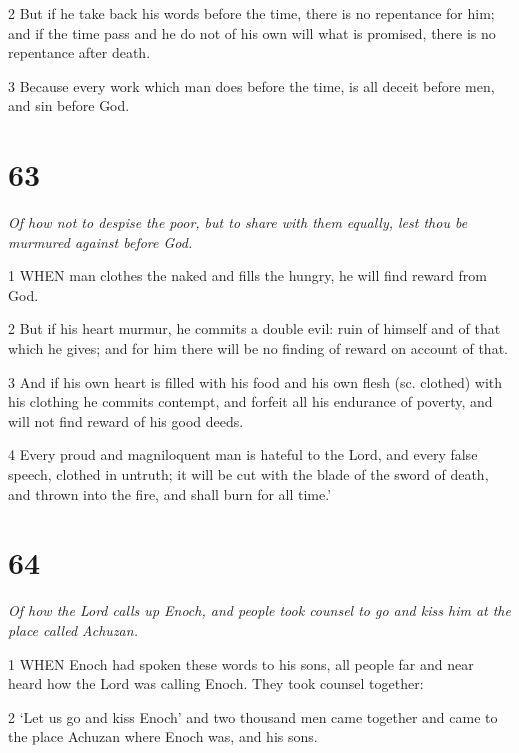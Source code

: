 \par 2 But if he take back his words before the time, there is no repentance for him; and if the time pass and he do not of his own will what is promised, there is no repentance after death.

\par 3 Because every work which man does before the time, is all deceit before men, and sin before God.



\chapter{63}

\par \textit{Of how not to despise the poor, but to share with them equally, lest thou be murmured against before God.}

\par 1 WHEN man clothes the naked and fills the hungry, he will find reward from God.

\par 2 But if his heart murmur, he commits a double evil: ruin of himself and of that which he gives; and for him there will be no finding of reward on account of that.

\par 3 And if his own heart is filled with his food and his own flesh (sc. clothed) with his clothing he commits contempt, and forfeit all his endurance of poverty, and will not find reward of his good deeds.

\par 4 Every proud and magniloquent man is hateful to the Lord, and every false speech, clothed in untruth; it will be cut with the blade of the sword of death, and thrown into the fire, and shall burn for all time.'

\chapter{64}

\par \textit{Of how the Lord calls up Enoch, and people took counsel to go and kiss him at the place called Achuzan.}

\par 1 WHEN Enoch had spoken these words to his sons, all people far and near heard how the Lord was calling Enoch. They took counsel together:

\par 2 ‘Let us go and kiss Enoch’ and two thousand men came together and came to the place Achuzan where Enoch was, and his sons.

